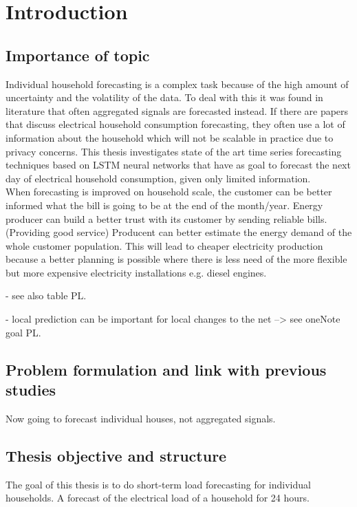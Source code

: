 \chapter{Introduction}
\label{cha:intro}









\section{Importance of topic}
Individual household forecasting is a complex task because of the high amount of uncertainty
and the volatility of the data. To deal with this it was found in literature that often aggregated signals are forecasted instead. If there are papers that discuss electrical household consumption forecasting, they often use a lot of information about the household which will not be scalable in practice due to privacy concerns. This thesis investigates state of the art time series forecasting techniques based on LSTM neural networks that have as goal to forecast the next day of electrical household consumption, given only limited information.\\

When forecasting is improved on household scale, the customer can be better informed what the bill is going to be at the end of the month/year.
Energy producer can build a better trust with its customer by sending reliable bills. (Providing good service)
Producent can better estimate the energy demand of the whole customer population. This will lead to cheaper electricity production because a better planning is possible where there is less need of the more 
flexible but more expensive electricity installations e.g. diesel engines.


- see also table PL. 

- local prediction can be important for local changes to the net --> see oneNote goal PL. 

\section{Problem formulation and link with previous studies}
Now going to forecast individual houses, not aggregated signals. 


\section{Thesis objective and structure}
The goal of this thesis is to do short-term load forecasting for individual households. A forecast of the electrical load of a household for 24 hours. 


